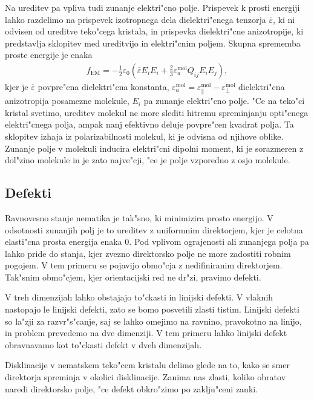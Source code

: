 \documentclass[a4paper,10pt]{article}
\begin{document}
Na ureditev pa vpliva tudi zunanje elektri"cno polje. 
Prispevek k prosti energiji lahko razdelimo na prispevek izotropnega dela dielektri"cnega tenzorja $\overline\varepsilon$, ki ni odvisen od ureditve teko"cega kristala, in prispevka dielektri"cne anizotropije, ki predstavlja sklopitev med ureditvijo in elektri"cnim poljem. 
Skupna sprememba proste energije je enaka
\begin{align}
\label{eq:dielektricna-sklopitev}
  f_{\mathrm{EM}} = -\frac{1}{2}\varepsilon_0 \left(\overline\varepsilon E_i E_i + \frac{2}{3}\varepsilon_a^{\mathrm{mol}} Q_{ij}E_iE_j \right),
\end{align}
kjer je $\overline{\varepsilon}$ povpre"cna dielektri"cna konstanta, $\varepsilon_a^{\mathrm{mol}} = \varepsilon_{\parallel}^{\mathrm{mol}} - \varepsilon_{\perp}^{\mathrm{mol}}$ dielektri"cna anizotropija posamezne molekule, $E_i$ pa zunanje elektri"cno polje. 
"Ce na teko"ci kristal svetimo, ureditev molekul ne more slediti hitremu spreminjanju opti"cnega elektri"cnega polja, ampak nanj efektivno deluje povpre"cen kvadrat polja. 
Ta sklopitev izhaja iz polarizabilnosti molekul, ki je odvisna od njihove oblike. 
Zunanje polje v molekuli inducira elektri"cni dipolni moment, ki je sorazmeren z dol"zino molekule in je zato najve"cji, "ce je polje vzporedno z osjo molekule. 

\subsection{Defekti}

Ravnovesno stanje nematika je tak"sno, ki minimizira prosto energijo. 
V odsotnosti zunanjih polj je to ureditev z uniformnim direktorjem, kjer je celotna elasti"cna prosta energija enaka 0\cite{mermin}. 
Pod vplivom ograjenosti ali zunanjega polja pa lahko pride do stanja, kjer zvezno direktorsko polje ne more zadostiti robnim pogojem. 
V tem primeru se pojavijo obmo"cja z nedifiniranim direktorjem. 
Tak"snim obmo"cjem, kjer orientacijski red ne dr"zi, pravimo defekti. 

V treh dimenzijah lahko obstajajo to"ckasti in linijski defekti\cite{degennes,kleman}. 
V vlaknih nastopajo le linijski defekti, zato se bomo posvetili zlasti tistim. 
Linijski defekti so la"zji za razvr"s"canje, saj se lahko omejimo na ravnino, pravokotno na linijo, in problem prevedemo na dve dimenziji. 
V tem primeru lahko linijski defekt obravnavamo kot to"ckasti defekt v dveh dimenzijah. 

Disklinacije v nematskem teko"cem kristalu delimo glede na to, kako se smer direktorja spreminja v okolici disklinacije. 
Zanima nas zlasti, koliko obratov naredi direktorsko polje, "ce defekt obkro"zimo po zaklju"ceni zanki. 
\end{document}
